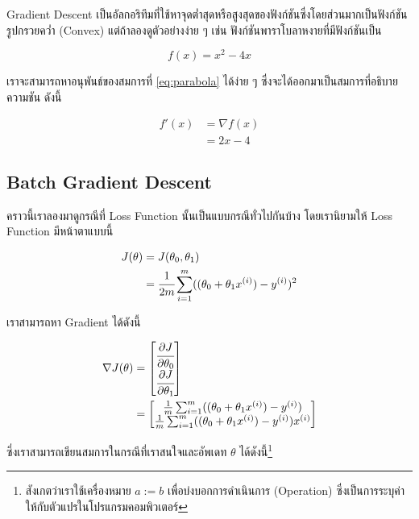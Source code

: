 Gradient Descent เป็นอัลกอริทึมที่ใช้หาจุดต่ำสุดหรือสูงสุดของฟังก์ชันซึ่งโดยส่วนมากเป็นฟังก์ชันรูปกรวยคว่ำ (Convex) แต่ถ้าลองดูตัวอย่างง่าย ๆ
เช่น ฟังก์ชันพาราโบลาหงายที่มีฟังก์ชันเป็น 

\begin{equation}\label{eq:parabola}
    f(x) = x^2 - 4x
\end{equation}

\noindent เราจะสามารถหาอนุพันธ์ของสมการที่ \ref{eq:parabola} ได้ง่าย ๆ ซึ่งจะได้ออกมาเป็นสมการที่อธิบายความชัน ดังนี้

\begin{align}\label{eq:eq:parabola_slope}
    f'(x) &= \nabla f(x) \nonumber \\
    &= 2x - 4
\end{align}

\subsection{Batch Gradient Descent}
\label{ssec:batch_grad}

คราวนี้เราลองมาดูกรณีที่ Loss Function นั้นเป็นแบบกรณีทั่วไปกันบ้าง โดยเรานิยามให้ Loss Function มีหน้าตาแบบนี้

\begin{align}
    J(\theta) &= J(\theta_0, \theta_1) \nonumber \\
    &= \cfrac{1}{2m} \sum_{i=1}^m ((\theta_0 + \theta_1 x^{(i)}) - y^{(i)})^2
\end{align}

\noindent เราสามารถหา Gradient ได้ดังนี้

\begin{align}
    \nabla J (\theta) &= \begin{bmatrix} \cfrac{\partial J}{\partial \theta_0}\\ \cfrac{\partial J}{\partial 
    \theta_1} \end{bmatrix} \\
    &=  \begin{bmatrix} \frac{1}{m} \sum_{i=1}^{m} ((\theta_0 + \theta_1 x^{(i)}) - y^{(i)}) \\ \frac{1}{m} 
    \sum_{i=1}^{m} ((\theta_0 + \theta_1 x^{(i)}) - y^{(i)})x^{(i)} \end{bmatrix}
\end{align}

\noindent ซึ่งเราสามารถเขียนสมการในกรณีที่เราสนใจและอัพเดท $\theta$ ได้ดังนี้\footnote{สังเกตว่าเราใช้เครื่องหมาย $a := b$ 
เพื่อบ่งบอกการดำเนินการ (Operation) ซึ่งเป็นการระบุค่าให้กับตัวแปรในโปรแกรมคอมพิวเตอร์}

